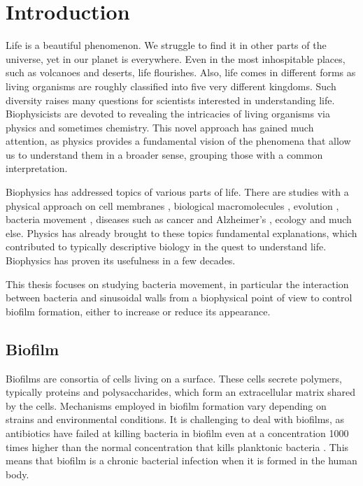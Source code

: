 \chapter{Introduction}

Life is a beautiful phenomenon. We struggle to find it in other parts of the universe, yet in our planet is everywhere. Even in the most inhospitable places, such as volcanoes and deserts, life flourishes. Also, life comes in different forms as living organisms are roughly classified into five very different kingdoms. Such diversity raises many questions for scientists interested in understanding life. Biophysicists are devoted to revealing the intricacies of living organisms via physics and sometimes chemistry. This novel approach has gained much attention, as physics provides a fundamental vision of the phenomena that allow us to understand them in a broader sense, grouping those with a common interpretation.

Biophysics has addressed topics of various parts of life. There are studies with a physical approach on cell membranes \cite{Nguyen2021PhotocatalyticSynthesis,Jin2020MechanosensitiveMechanisms,Janmey2006BiophysicalMembranes}, biological macromolecules \cite{Allewell2013MolecularSciences, 2008MethodsFunction, Fierz2019BiophysicsDynamics}, evolution \cite{Sikosek2014BiophysicsBiophysics}, bacteria movement \cite{Lauga2020TheMotility, Ananthakrishnan2007TheMovement}, diseases such as cancer and Alzheimer's \cite{White2019TheCancer, Weickenmeier2019ASclerosis}, ecology \cite{Helmuth2002HowBiophysics} and much else. Physics has already brought to these topics fundamental explanations, which contributed to typically descriptive biology in the quest to understand life. Biophysics has proven its usefulness in a few decades.

This thesis focuses on studying bacteria movement, in particular the interaction between bacteria and sinusoidal walls from a biophysical point of view to control biofilm formation, either to increase or reduce its appearance.

\section{Biofilm}

Biofilms are consortia of cells living on a surface. These cells secrete polymers, typically proteins and polysaccharides, which form an extracellular matrix shared by the cells. Mechanisms employed in biofilm formation vary depending on strains and environmental conditions. It is challenging to deal with biofilms, as antibiotics have failed at killing bacteria in biofilm even at a concentration 1000 times higher than the normal concentration that kills planktonic bacteria \cite{Costerton1987BacterialDisease.}. This means that biofilm is a chronic bacterial infection when it is formed in the human body.

